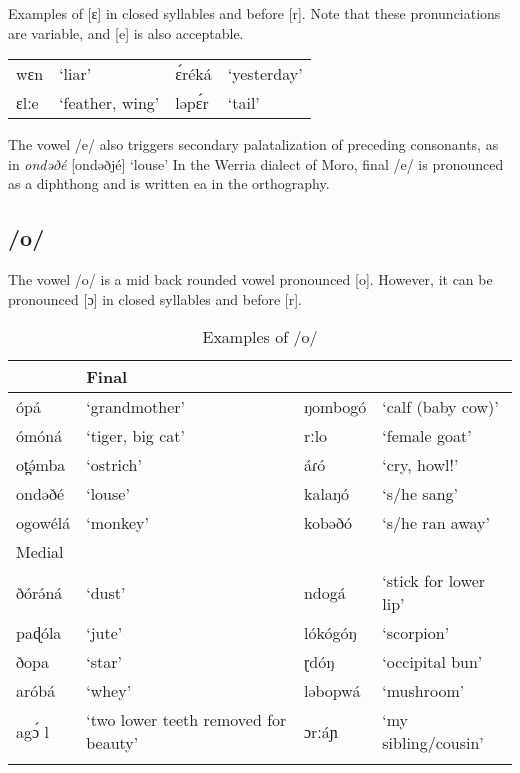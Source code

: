 Examples of [ɛ] in closed syllables and before [r]. Note that these pronunciations are variable, and [e] is also acceptable. 

\ea \begin{tabular}[t]{llll}
	
wɛn		&	‘liar’			&	ɛ́réká	&	‘yesterday’\\
ɛlːe	&	‘feather, wing’	&	ləpɛ́r	&	‘tail’
\end{tabular} \label{ex:ch2:2}
\z

The vowel /e/ also triggers secondary palatalization of preceding consonants, as in \textit{ondəðé} [ondəðjé] ‘louse’ In the Werria dialect of Moro, final /e/ is pronounced as a diphthong and is written ea in the orthography. 

\subsection{/o/}

The vowel /o/ is a mid back rounded vowel pronounced [o]. However, it can be pronounced [ɔ] in closed syllables and before [r].

\begin{table} 
\caption{Examples of /o/}	
 \label{tab:ch2:7}
\begin{tabular}[t]{lp{3.5cm}lp{3.5cm}}
\lsptoprule
\multicolumn{2}{l}{Initial} &	\multicolumn{2}{l}{Final}  \\
\midrule
ópá	& ‘grandmother’ & 	ŋombogó	& ‘calf (baby cow)’ \\
ómóná & 	‘tiger, big cat’ & 	rːlo	& ‘female goat’ \\
ot̪ə́mba & 	‘ostrich’ & 	áɾó	& ‘cry, howl!’\\
ondəðé	& ‘louse’ & 	kalaŋó & 	‘s/he sang’\\
ogowélá	& ‘monkey’	& kobəðó & 	‘s/he ran away’\\
\midrule
 \multicolumn{2}{l}{Medial} & & \\
 \midrule 
ðórə́ná	& ‘dust’ & 	ndogá & 	`stick for lower lip'\\
paɖóla	& 	‘jute’ & 	lókógóŋ	& 	‘scorpion’ \\
ðopa	& ‘star’& 	ɽdóŋ	& ‘occipital bun’\\
aróbá	& ‘whey’ & 	ləbopwá	& ‘mushroom’\\
agɔ́ l & ‘two lower teeth removed for beauty’ & ɔrːáɲ	 & ‘my sibling/cousin’ \\
\lspbottomrule	
\end{tabular}
\end{table}

